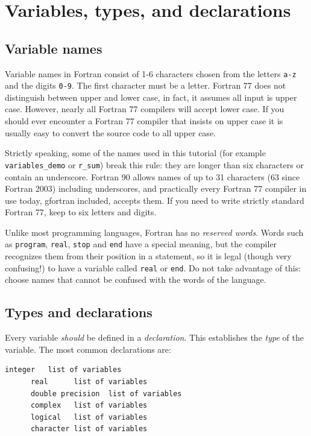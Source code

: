 \chapter{Variables, types, and declarations}

\section{Variable names}

Variable names in Fortran consist of 1-6 characters chosen from the letters \texttt{a-z} and the digits \texttt{0-9}. The first character must be a letter. Fortran 77 does not distinguish between upper and lower case, in fact, it assumes all input is upper case. However, nearly all Fortran 77 compilers will accept lower case. If you should ever encounter a Fortran 77 compiler that insists on upper case it is usually easy to convert the source code to all upper case.

Strictly speaking, some of the names used in this tutorial (for example \texttt{variables\_demo} or \texttt{r\_sum}) break this rule: they are longer than six characters or contain an underscore. Fortran 90 allows names of up to 31 characters (63 since Fortran 2003) including underscores, and practically every Fortran 77 compiler in use today, gfortran included, accepts them. If you need to write strictly standard Fortran 77, keep to six letters and digits.

Unlike most programming languages, Fortran has no \emph{reserved words}. Words such as \texttt{program}, \texttt{real}, \texttt{stop} and \texttt{end} have a special meaning, but the compiler recognizes them from their position in a statement, so it is legal (though very confusing!) to have a variable called \texttt{real} or \texttt{end}. Do not take advantage of this: choose names that cannot be confused with the words of the language.

\section{Types and declarations}

Every variable \emph{should} be defined in a \emph{declaration}. This establishes the \emph{type} of the variable. The most common declarations are:

\begin{lstlisting}[style=fortran77]
      integer   list of variables
      real      list of variables
      double precision  list of variables
      complex   list of variables
      logical   list of variables
      character list of variables
\end{lstlisting}

